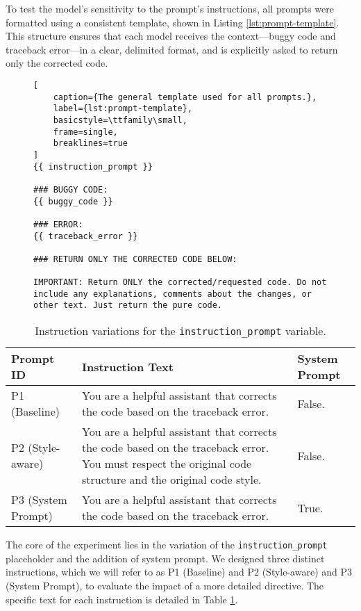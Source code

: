 To test the model's sensitivity to the prompt's instructions, all prompts were formatted 
using a consistent template, shown in Listing \ref{lst:prompt-template}. This structure ensures 
that each model receives the context—buggy code and traceback error—in a clear, delimited 
format, and is explicitly asked to return only the corrected code.

\begin{figure}[h!]
\begin{lstlisting}[
    caption={The general template used for all prompts.},
    label={lst:prompt-template},
    basicstyle=\ttfamily\small,
    frame=single,
    breaklines=true
]
{{ instruction_prompt }}

### BUGGY CODE:
{{ buggy_code }}

### ERROR:
{{ traceback_error }}

### RETURN ONLY THE CORRECTED CODE BELOW:

IMPORTANT: Return ONLY the corrected/requested code. Do not include any explanations, comments about the changes, or other text. Just return the pure code.

\end{lstlisting} %
\end{figure}
\begin{table}[h!]
\centering
\caption{Instruction variations for the \texttt{instruction\_prompt} variable.}
\label{tab:prompt-instructions}
\begin{tabular}{|l|p{}|p{}|}
\hline
\textbf{Prompt ID} & \textbf{Instruction Text} & \textbf{System Prompt} \\ \hline
P1 (Baseline) & You are a helpful assistant that corrects the code based on the traceback error. & False. \\\hline
P2 (Style-aware) & You are a helpful assistant that corrects the code based on the traceback error. You must respect the original code structure and the original code style. & False. \\ \hline
P3 (System Prompt) & You are a helpful assistant that corrects the code based on the traceback error. & True. \\ \hline
\end{tabular}
\end{table}
The core of the experiment lies in the variation of the \texttt{instruction\_prompt} placeholder and the addition of system prompt. 
We designed three distinct instructions, which we will refer to as P1 (Baseline) and P2 (Style-aware) and P3 (System Prompt), 
to evaluate the impact of a more detailed directive. The specific text for each instruction 
is detailed in Table \ref{tab:prompt-instructions}.

